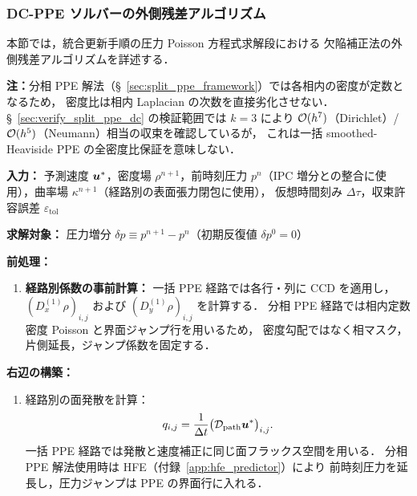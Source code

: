 
\subsubsection{DC-PPE ソルバーの外側残差アルゴリズム}
\label{app:dc_ppe_detail}

本節では，統合更新手順の圧力 Poisson 方程式求解段における
欠陥補正法の外側残差アルゴリズムを詳述する．

\noindent\textbf{注：}分相 PPE 解法（§~\ref{sec:split_ppe_framework}）では各相内の密度が定数となるため，
密度比は相内 Laplacian の次数を直接劣化させない．
§~\ref{sec:verify_split_ppe_dc} の検証範囲では $k{=}3$ により
$\mathcal{O}(h^7)$（Dirichlet）/ $\mathcal{O}(h^5)$（Neumann）相当の収束を確認しているが，
これは一括 smoothed-Heaviside PPE の全密度比保証を意味しない．

\textbf{入力：} 予測速度 $\bm{u}^*$，密度場 $\rho^{n+1}$，前時刻圧力 $p^n$（IPC 増分との整合に使用），曲率場 $\kappa^{n+1}$（経路別の表面張力閉包に使用），
仮想時間刻み $\Delta\tau$，収束許容誤差 $\varepsilon_{\mathrm{tol}}$

\textbf{求解対象：} 圧力増分 $\delta p \equiv p^{n+1} - p^n$（初期反復値 $\delta p^0 = 0$）

\medskip
\textbf{前処理：}
\begin{enumerate}
  \item[(6.0)] \textbf{経路別係数の事前計算：}
  一括 PPE 経路では各行・列に CCD を適用し，
  $(D_x^{(1)}\rho)_{i,j}$ および $(D_y^{(1)}\rho)_{i,j}$ を計算する．
  分相 PPE 経路では相内定数密度 Poisson と界面ジャンプ行を用いるため，
  密度勾配ではなく相マスク，片側延長，ジャンプ係数を固定する．
\end{enumerate}

\textbf{右辺の構築：}
\begin{enumerate}
  \item[(6.1)] 経路別の面発散を計算：
  \[
    q_{i,j} = \frac{1}{\Delta t}\bigl(\mathcal{D}_{\mathrm{path}}\bm{u}^*\bigr)_{i,j}.
  \]
  一括 PPE 経路では発散と速度補正に同じ面フラックス空間を用いる．
  分相 PPE 解法使用時は HFE（付録~\ref{app:hfe_predictor}）により
  前時刻圧力を延長し，圧力ジャンプは PPE の界面行に入れる．
\end{enumerate}

